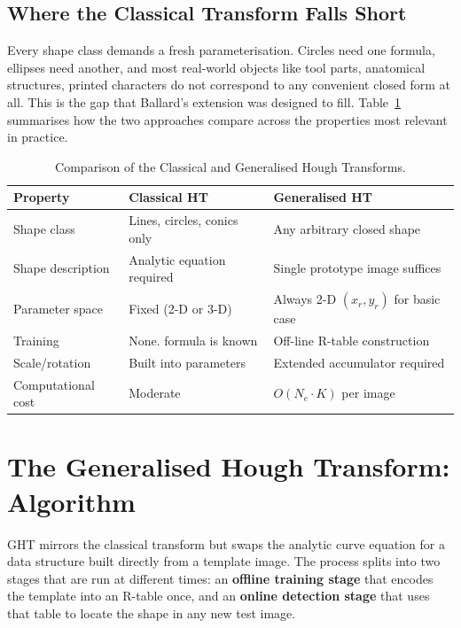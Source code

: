 \documentclass[12pt,a4paper]{article}
\begin{document}
\subsection{Where the Classical Transform Falls Short}

Every shape class demands a fresh parameterisation.  Circles need one formula,
ellipses need another, and most real-world objects like tool parts, anatomical
structures, printed characters do not correspond to any convenient closed form at
all.  This is the gap that Ballard's extension was designed to fill.
Table~\ref{tab:comparison} summarises how the two approaches compare across the
properties most relevant in practice.

\begin{table}[H]
\centering
\caption{Comparison of the Classical and Generalised Hough Transforms.}
\label{tab:comparison}
\renewcommand{\arraystretch}{1.3}
\begin{tabular}{@{} l p{5cm} p{5cm} @{}}
\toprule
\textbf{Property} & \textbf{Classical HT} & \textbf{Generalised HT} \\
\midrule
Shape class        & Lines, circles, conics only & Any arbitrary closed shape \\
Shape description  & Analytic equation required  & Single prototype image suffices \\
Parameter space    & Fixed (2-D or 3-D)          & Always 2-D $(x_r, y_r)$ for basic case \\
Training           & None. formula is known     & Off-line R-table construction \\
Scale/rotation     & Built into parameters       & Extended accumulator required \\
Computational cost & Moderate                    & $O(N_e \cdot K)$ per image \\
\bottomrule
\end{tabular}
\end{table}

\section{The Generalised Hough Transform: Algorithm}
\label{sec:algorithm}

GHT mirrors the classical transform but swaps the analytic curve
equation for a data structure built directly from a template image.  The process
splits into two stages that are run at different times: an \textbf{offline training
stage} that encodes the template into an R-table once, and an \textbf{online
detection stage} that uses that table to locate the shape in any new test image.
\end{document}
